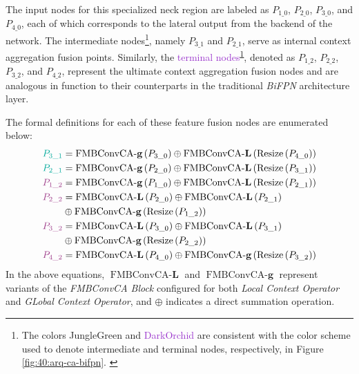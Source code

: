 The input nodes for this specialized neck region are labeled as \(P_{1\_0}\), \(P_{2\_0}\), \(P_{3\_0}\), and \(P_{4\_0}\), each of which corresponds to the lateral output from the backend of the network. The \textcolor{JungleGreen}{intermediate nodes}\footnote{The colors \textcolor{JungleGreen}{JungleGreen} and \textcolor{DarkOrchid}{DarkOrchid} are consistent with the color scheme used to denote intermediate and terminal nodes, respectively, in Figure \ref{fig:40:arq-ca-bifpn}. \label{fn:1}}, namely \(P_{3\_1}\) and \(P_{2\_1}\), serve as internal context aggregation fusion points. Similarly, the \textcolor{DarkOrchid}{terminal nodes}\textsuperscript{\ref{fn:1}}, denoted as \(P_{1\_2}\), \(P_{2\_2}\), \(P_{3\_2}\), and \(P_{4\_2}\), represent the ultimate context aggregation fusion nodes and are analogous in function to their counterparts in the traditional \textit{BiFPN} architecture layer.

The formal definitions for each of these feature fusion nodes are enumerated below:
\begin{align}
    \textcolor{JungleGreen}{P_{3\_1}} &= \operatorname{FMBConvCA-\textbf{g}}\left(P_{3\_0} \right) \oplus \operatorname{FMBConvCA-\textbf{L}}\left(\operatorname{Resize}\left(P_{4\_0} \right)\right) \\
    \textcolor{JungleGreen}{P_{2\_1}} &= \operatorname{FMBConvCA-\textbf{g}}\left(P_{2\_0} \right) \oplus \operatorname{FMBConvCA-\textbf{L}}\left(\operatorname{Resize}\left(P_{3\_1} \right)\right) \\
    \textcolor{DarkOrchid}{P_{1\_2}}  &= \operatorname{FMBConvCA-\textbf{g}}\left(P_{1\_0} \right) \oplus \operatorname{FMBConvCA-\textbf{L}}\left(\operatorname{Resize}\left(P_{2\_1} \right)\right) \\
    \textcolor{DarkOrchid}{P_{2\_2}}  &= \operatorname{FMBConvCA-\textbf{L}}\left(P_{2\_0} \right) \oplus \operatorname{FMBConvCA-\textbf{L}}\left(P_{2\_1} \right) \\ 
    & \oplus \operatorname{FMBConvCA-\textbf{g}}\left(\operatorname{Resize}\left(P_{1\_2} \right)\right)\\
    \textcolor{DarkOrchid}{P_{3\_2}}  &= \operatorname{FMBConvCA-\textbf{L}}\left(P_{3\_0} \right) \oplus \operatorname{FMBConvCA-\textbf{L}}\left(P_{3\_1} \right) \\ 
    & \oplus \operatorname{FMBConvCA-\textbf{g}}\left(\operatorname{Resize}\left(P_{2\_2} \right)\right)\\
    \textcolor{DarkOrchid}{P_{4\_2}}  &= \operatorname{FMBConvCA-\textbf{L}}\left(P_{4\_0} \right) \oplus \operatorname{FMBConvCA-\textbf{g}}\left(\operatorname{Resize}\left(P_{3\_2} \right)\right)
\end{align}
In the above equations, \(\operatorname{FMBConvCA-\textbf{L}}\) and \(\operatorname{FMBConvCA-\textbf{g}}\) represent variants of the \textit{FMBConvCA Block} configured for both \textit{Local Context Operator} and \textit{GLobal Context Operator}, and \( \oplus \) indicates a direct summation operation.\\

